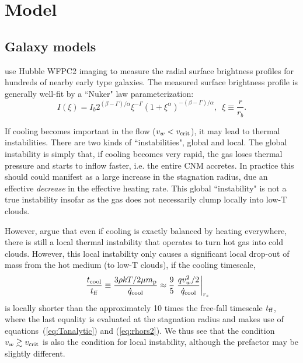 \documentclass[usenatbib,fleqn]{mn2e}
\newcommand{\rs}{r_s}
\newcommand{\vw}{v_w}
\renewcommand{\mp}{m_{\rm p}}
\newcommand{\tcool}{t_{\rm cool}}
\newcommand{\tff}{t_{\rm ff}}
\begin{document}
\section{Model}
\label{sec:model}
\subsection{Galaxy models}
\citet{LauerFaber+:2007a} use Hubble WFPC2 imaging to measure the
radial surface brightness profiles for hundreds of nearby early type galaxies. The measured surface brightness profile is generally well-fit by a ``Nuker" law parameterization:
\begin{equation}
  I(\xi)=I_b 2^{(\beta-\Gamma)/\alpha} \xi^{-\Gamma} (1+\xi^\alpha)^{-(\beta-\Gamma)/\alpha}, \,\,\,\xi\equiv\frac{r}{r_b}.
\end{equation}

If cooling becomes important in the flow ($v_{w} < v_{\rm crit}$), it may lead to thermal instabilities.  There are two kinds of ``instabilities", global and local.  The global instability is simply that, if cooling becomes very rapid, the gas loses thermal pressure and starts to inflow faster, i.e. the entire CNM accretes.  In
practice this should could manifest as a large increase in the stagnation radius, due an effective {\it decrease} in the effective heating rate.  This global ``instability" is not a true instability insofar as the gas does not necessarily clump locally into low-T clouds.

However, \citet{McCourt+12} argue that even if cooling is exactly balanced by heating everywhere, there is still a local thermal instability that operates to turn hot gas into cold clouds.  However, this local instability only causes a significant local drop-out of mass from the hot medium (to low-T clouds), if the cooling timescale,
\begin{align}
\frac{\tcool}{\tff} &\equiv \frac{3\rho k T/2 \mu \mp}{\dot{q}_{\rm cool}} \approx \frac{9}{5} \left. \frac{q \vw^2/2}{\dot{q}_{\rm cool}}\right|_{\rs}
\end{align} 
is locally shorter than the approximately 10 times the free-fall
timescale $t_{\rm ff}$, where the last equality is evaluated at the stagnation radius and makes use of equations~(\ref{eq:Tanalytic}) and (\ref{eq:rhors2}).  We thus see that the condition $v_w \gtrsim v_{\rm crit}$ is also the condition for local instability, although the prefactor may be slightly different.
\end{document}
